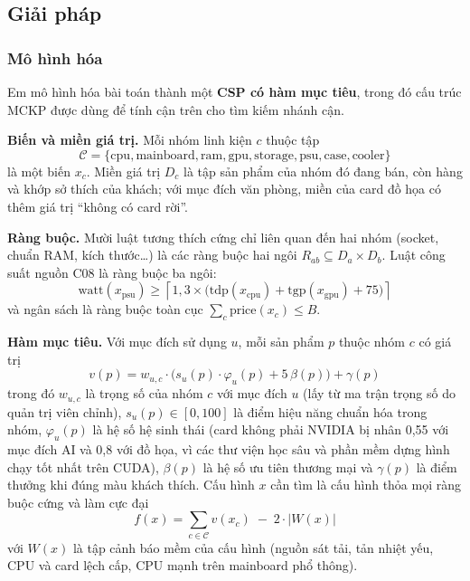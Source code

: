 \subsection{Giải pháp}

\subsubsection{Mô hình hóa}

Em mô hình hóa bài toán thành một \textbf{CSP có hàm mục tiêu}, trong đó cấu trúc MCKP được dùng để tính cận trên cho tìm kiếm nhánh cận.

\textbf{Biến và miền giá trị.} Mỗi nhóm linh kiện $c$ thuộc tập
\[
\mathcal{C} = \{\text{cpu}, \text{mainboard}, \text{ram}, \text{gpu}, \text{storage}, \text{psu}, \text{case}, \text{cooler}\}
\]
là một biến $x_c$. Miền giá trị $D_c$ là tập sản phẩm của nhóm đó đang bán, còn hàng và khớp sở thích của khách; với mục đích văn phòng, miền của card đồ họa có thêm giá trị ``không có card rời''.

\textbf{Ràng buộc.} Mười luật tương thích cứng chỉ liên quan đến hai nhóm (socket, chuẩn RAM, kích thước\ldots) là các ràng buộc hai ngôi $R_{ab} \subseteq D_a \times D_b$. Luật công suất nguồn C08 là ràng buộc ba ngôi:
\begin{equation}
\text{watt}(x_{\text{psu}}) \ge \left\lceil 1{,}3 \times \big(\text{tdp}(x_{\text{cpu}}) + \text{tgp}(x_{\text{gpu}}) + 75\big) \right\rceil
\label{eq:c08}
\end{equation}
và ngân sách là ràng buộc toàn cục $\sum_{c} \text{price}(x_c) \le B$.

\textbf{Hàm mục tiêu.} Với mục đích sử dụng $u$, mỗi sản phẩm $p$ thuộc nhóm $c$ có giá trị
\begin{equation}
v(p) = w_{u,c} \cdot \big( s_u(p) \cdot \varphi_u(p) + 5\,\beta(p) \big) + \gamma(p)
\label{eq:value}
\end{equation}
trong đó $w_{u,c}$ là trọng số của nhóm $c$ với mục đích $u$ (lấy từ ma trận trọng số do quản trị viên chỉnh), $s_u(p) \in [0, 100]$ là điểm hiệu năng chuẩn hóa trong nhóm, $\varphi_u(p)$ là hệ số hệ sinh thái (card không phải NVIDIA bị nhân 0,55 với mục đích AI và 0,8 với đồ họa, vì các thư viện học sâu và phần mềm dựng hình chạy tốt nhất trên CUDA), $\beta(p)$ là hệ số ưu tiên thương mại và $\gamma(p)$ là điểm thưởng khi đúng màu khách thích. Cấu hình $x$ cần tìm là cấu hình thỏa mọi ràng buộc cứng và làm cực đại
\begin{equation}
f(x) = \sum_{c \in \mathcal{C}} v(x_c) \;-\; 2 \cdot \big|W(x)\big|
\label{eq:objective}
\end{equation}
với $W(x)$ là tập cảnh báo mềm của cấu hình (nguồn sát tải, tản nhiệt yếu, CPU và card lệch cấp, CPU mạnh trên mainboard phổ thông).

